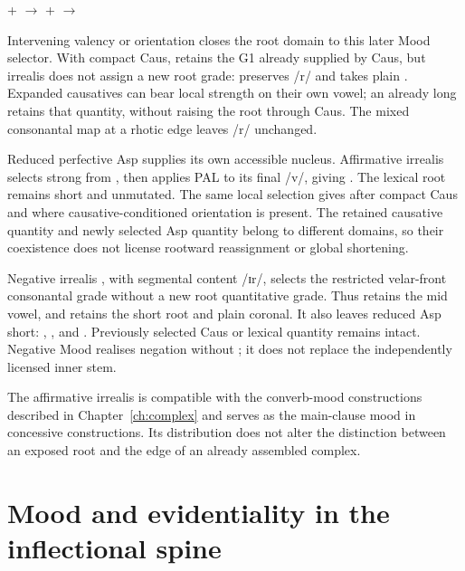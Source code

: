 \pex
\a {} +  $\rightarrow$ 
\a {} +  $\rightarrow$ 
\xe

Intervening valency or orientation closes the root domain to this later
Mood selector. With compact Caus,  retains the G1
already supplied by Caus, but irrealis does not assign a new root grade:
 preserves /r/ and takes plain . Expanded
causatives can bear local strength on their own vowel; an already long
 retains that quantity, without raising the root through Caus.
The mixed consonantal map at a rhotic edge leaves /r/ unchanged.

Reduced perfective Asp supplies its own accessible nucleus. Affirmative
irrealis selects strong  from , then applies
PAL to its final /v/, giving . The lexical root
remains short and unmutated. The same local selection gives
 after compact Caus and
 where causative-conditioned orientation
 is present. The retained causative quantity and newly
selected Asp quantity belong to different domains, so their coexistence
does not license rootward reassignment or global shortening.

Negative irrealis , with segmental content /ɪr/, selects the
restricted velar-front consonantal grade without a new root quantitative grade. Thus
 retains the mid vowel, and  retains
the short root and plain coronal. It also leaves reduced Asp
 short: ,
, and . Previously selected
Caus or lexical quantity remains intact. Negative Mood realises
negation without ; it does not replace the independently
licensed inner stem.

\pex
\a {} 
\a {} 
\xe

The affirmative irrealis is compatible with the converb-mood
constructions described in Chapter~\ref{ch:complex} and serves as the
main-clause mood in concessive constructions. Its distribution does
not alter the distinction between an exposed root and the edge of an
already assembled complex.


\section{Mood and evidentiality in the inflectional spine}\label{sec:vm-ip}

